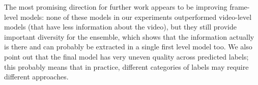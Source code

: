 \documentclass[runningheads]{llncs}
\begin{document}
The most promising direction for further work appears to be improving frame-level models: none of these models in our experiments outperformed video-level models (that have less information about the video), but they still provide important diversity for the ensemble, which shows that the information actually is there and can probably be extracted in a single first level model too. We also point out that the final model has very uneven quality across predicted labels; this probably means that in practice, different categories of labels may require different approaches.



\end{document}
